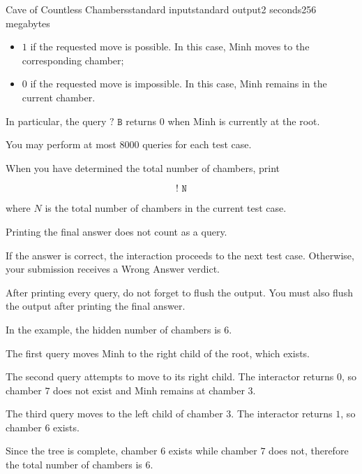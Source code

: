 \begin{problem}{Cave of Countless Chambers}{standard input}{standard output}{2 seconds}{256 megabytes}
\begin{itemize}
\item $1$ if the requested move is possible. In this case, Minh moves to the corresponding chamber;
\item $0$ if the requested move is impossible. In this case, Minh remains in the current chamber.
\end{itemize}

In particular, the query $\texttt{? B}$ returns $0$ when Minh is currently at the root.

You may perform at most $8000$ queries for each test case.

When you have determined the total number of chambers, print

$$\texttt{! N}$$

where $N$ is the total number of chambers in the current test case.

Printing the final answer does not count as a query.

If the answer is correct, the interaction proceeds to the next test case. Otherwise, your submission receives a Wrong Answer verdict.

After printing every query, do not forget to flush the output. You must also flush the output after printing the final answer.

\Example

\begin{example}
%
\end{example}

\Note
In the example, the hidden number of chambers is $6$.

The first query moves Minh to the right child of the root, which exists.

The second query attempts to move to its right child. The interactor returns $0$, so chamber $7$ does not exist and Minh remains at chamber $3$.

The third query moves to the left child of chamber $3$. The interactor returns $1$, so chamber $6$ exists.

Since the tree is complete, chamber $6$ exists while chamber $7$ does not, therefore the total number of chambers is $6$.

\end{problem}

